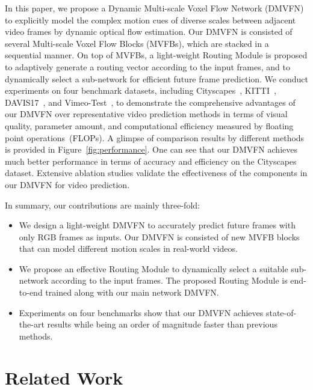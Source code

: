 \documentclass[10pt,twocolumn,letterpaper]{article}
\begin{document}
In this paper, we propose a Dynamic Multi-scale Voxel Flow Network (DMVFN) to explicitly model the complex motion cues of diverse scales between adjacent video frames by dynamic optical flow estimation. Our DMVFN is consisted of several Multi-scale Voxel Flow Blocks (MVFBs), which are stacked in a sequential manner. On top of MVFBs, a light-weight Routing Module is proposed to adaptively generate a routing vector according to the input frames, and to dynamically select a sub-network for efficient future frame prediction. We conduct experiments on four benchmark datasets, including Cityscapes~\cite{cityscapes}, KITTI~\cite{kitti}, DAVIS17~\cite{davis}, and Vimeo-Test~\cite{vimeo}, to demonstrate the comprehensive advantages of our DMVFN over representative video prediction methods in terms of visual quality, parameter amount, and computational efficiency measured by floating point operations~(FLOPs). A glimpse of comparison results by different methods is provided in Figure~\ref{fig:performance}. One can see that our DMVFN achieves much better performance in terms of accuracy and efficiency on the Cityscapes~\cite{cityscapes} dataset. Extensive ablation studies validate the effectiveness of the components in our DMVFN for video prediction.

In summary, our contributions are mainly three-fold:
\begin{itemize}
    \item We design a light-weight DMVFN to accurately predict future frames with only RGB frames as inputs. Our DMVFN is consisted of new MVFB blocks that can model different motion scales in real-world videos.
    
    \item We propose an effective Routing Module to dynamically select a suitable sub-network according to the input frames. The proposed Routing Module is end-to-end trained along with our main network DMVFN.
    
    \item Experiments on four benchmarks show that our DMVFN achieves state-of-the-art results while being an order of magnitude faster than previous methods.
\end{itemize} 	
\section{Related Work}
\end{document}
